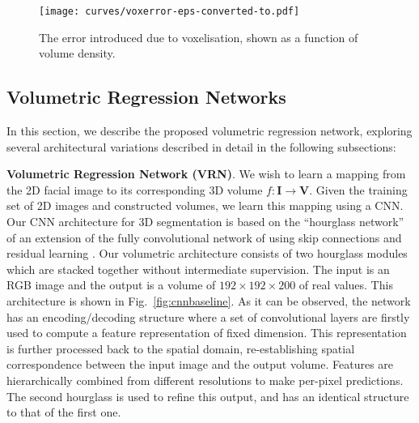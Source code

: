 \begin{figure}
\texttt{[image: curves/voxerror-eps-converted-to.pdf]}
\caption{The error introduced due to voxelisation, shown as a function of volume density.}
\label{fig:voxerror}
\end{figure}

\subsection{Volumetric Regression Networks}


In this section, we describe the proposed volumetric regression network, exploring several architectural variations described in detail in the following subsections:

\textbf{Volumetric Regression Network (VRN)}. We wish to learn a mapping from the 2D facial image to its
corresponding 3D volume $f: \mathbf{I} \rightarrow \mathbf{V}$. Given
the training set of 2D images and constructed volumes, we learn this mapping using a CNN. Our CNN
architecture for 3D segmentation is based on the ``hourglass
network'' of \cite{newell2016stacked} an extension of the fully
convolutional network of \cite{long2015fully} using skip connections
and residual learning \cite{he2015deep}. Our volumetric architecture consists of two hourglass
modules which are stacked together without intermediate
supervision. The input is an RGB image and the output is a volume of $192\times 192\times 200$ of real values. This architecture is
shown in Fig.~\ref{fig:cnnbaseline}. As it can be observed, the
network has an encoding/decoding structure where a set of convolutional layers are firstly used to compute a feature representation of fixed dimension. This representation is further processed back to the spatial domain, re-establishing spatial correspondence between the input image and the output volume. Features are hierarchically
combined from different resolutions to make per-pixel predictions. The second hourglass is used to refine this output, and has an identical structure to that of the first one.

